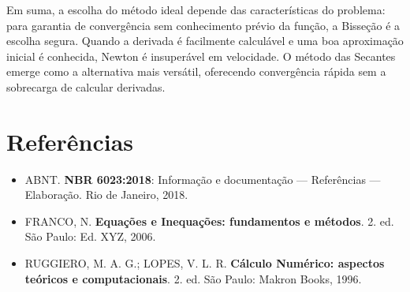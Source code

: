\documentclass[12pt,a4paper]{article}
\begin{document}
Em suma, a escolha do método ideal depende das características do problema: para garantia de convergência sem conhecimento prévio da função, a Bisseção é a escolha segura. Quando a derivada é facilmente calculável e uma boa aproximação inicial é conhecida, Newton é insuperável em velocidade. O método das Secantes emerge como a alternativa mais versátil, oferecendo convergência rápida sem a sobrecarga de calcular derivadas.

\section*{Referências}
\begin{itemize}\itemsep0.3em
  \item ABNT. \textbf{NBR 6023:2018}: Informação e documentação — Referências — Elaboração. Rio de Janeiro, 2018.
  \item FRANCO, N. \textbf{Equações e Inequações: fundamentos e métodos}. 2. ed. São Paulo: Ed. XYZ, 2006.
  \item RUGGIERO, M. A. G.; LOPES, V. L. R. \textbf{Cálculo Numérico: aspectos teóricos e computacionais}. 2. ed. São Paulo: Makron Books, 1996.
\end{itemize}
\end{document}
